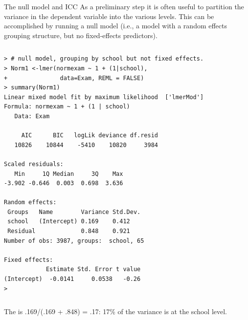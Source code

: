 \documentclass[table,smaller]{beamer}
\begin{document}
\begin{frame}[fragile,label=sec-5-3]{The null model and ICC}
 As a preliminary step it is often useful to partition the variance in the dependent variable into the various levels. This can be accomplished by running a null model (i.e., a model with a random effects grouping structure, but no fixed-effects predictors).

\vspace{-.5em}
\begin{columns}
\begin{block}{}
\begin{verbatim}
> # null model, grouping by school but not fixed effects.
> Norm1 <-lmer(normexam ~ 1 + (1|school),
+               data=Exam, REML = FALSE)
> summary(Norm1)
Linear mixed model fit by maximum likelihood  ['lmerMod']
Formula: normexam ~ 1 + (1 | school)
   Data: Exam

     AIC      BIC   logLik deviance df.resid 
   10826    10844    -5410    10820     3984 

Scaled residuals: 
   Min     1Q Median     3Q    Max 
-3.902 -0.646  0.003  0.698  3.636 

Random effects:
 Groups   Name        Variance Std.Dev.
 school   (Intercept) 0.169    0.412   
 Residual             0.848    0.921   
Number of obs: 3987, groups:  school, 65

Fixed effects:
            Estimate Std. Error t value
(Intercept)  -0.0141     0.0538   -0.26
>
\end{verbatim}
\end{block}
\end{columns}
\vspace{.5em}

The is .169/(.169 + .848) = .17: 17\% of the variance is at the school level.
\end{frame}
\end{document}
